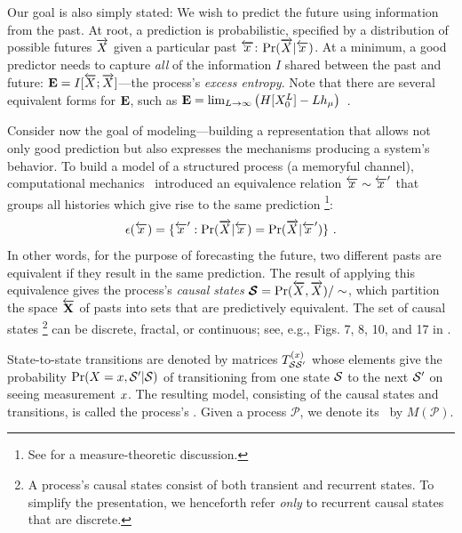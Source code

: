 Our goal is also simply stated: We wish to
predict the future using information from the past. At root, a prediction is
probabilistic, specified by a distribution of possible futures $\overrightarrow{{X}}$
given a particular past ${\overleftarrow {{x}}}$: $\Pr(\overrightarrow{{X}}|{\overleftarrow {{x}}})$. At a minimum, a
good predictor needs to capture \emph{all} of the information $I$ shared
between the past and future: ${\bf E} = I[\overleftarrow {{X}};\overrightarrow{{X}}]$---the process's
\emph{excess entropy}. Note that there are several equivalent forms for ${\bf E}$,
such as ${\bf E} = \lim_{L\rightarrow\infty}\left( 
H[{X}_0^L] - Lh_\mu \right)$~\cite[and references therein]{Crut01a}.

Consider now the goal of modeling---building a representation that allows not
only good prediction but also expresses the mechanisms producing a system's
behavior. To build a model of a structured process (a memoryful channel),
computational mechanics~\cite{Crut88a} introduced an equivalence relation
${\overleftarrow {{x}}} \sim {\overleftarrow { {x} }}^\prime$
that groups all histories which give rise to the same prediction
\footnote{See  for a measure-theoretic discussion.}:
\begin{equation}
\epsilon({\overleftarrow {{x}}}) =
  \{ {\overleftarrow {{x}}}^\prime: \Pr(\overrightarrow{{X}}|{\overleftarrow {{x}}}) = \Pr(\overrightarrow{{X}}|{\overleftarrow {{x}}}^\prime) \} ~. 
\label{Eq:PredictiveEquivalence}
\end{equation}
In other words, for the purpose of forecasting the future, two different pasts
are equivalent if they result in the same prediction. The result of applying
this equivalence gives the process's \emph{causal states} 
$\boldsymbol{\mathcal{S}} = \Pr(\overleftarrow {{X}},\overrightarrow{{X}}) / \sim$, which partition the space
${ \overleftarrow {\rm {\bf  {X} }} }$ of pasts into sets that are predictively equivalent.
The set of causal states
\footnote{A process's causal states consist of both transient and recurrent
states. To simplify the presentation, we henceforth refer \emph{only} to
recurrent causal states that are discrete.}
can be discrete, fractal, or continuous;
see, e.g., Figs. 7, 8, 10, and 17 in .

State-to-state transitions are denoted by matrices
$T_{\mathcal{S} \mathcal{S}^\prime}^{({x})}$ whose elements give the
probability $\Pr({X}={x},\mathcal{S}^\prime|\mathcal{S})$ of transitioning
from one state $\mathcal{S}$ to the next $\mathcal{S}^\prime$ on seeing
measurement ${x}$. The resulting model, consisting of the causal
states and transitions, is called the process's \emph{\eM}. Given a process
$\mathcal{P}$, we denote its \eM\ by $M(\mathcal{P})$.
 
